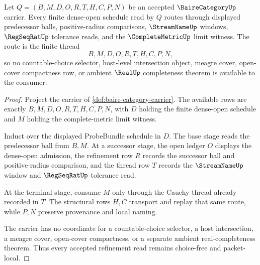 \begin{theorem}
\label{thm:bairecategory-refinement-choice-free}
Let $Q=(B,M,D,O,R,T,H,C,P,N)$ be an accepted $\BaireCategoryUp$ carrier. Every finite dense-open schedule read by $Q$ routes through displayed predecessor balls, positive-radius comparisons, $\StreamNameUp$ windows, $\RegSeqRatUp$ tolerance reads, and the $\CompleteMetricUp$ limit witness. The route is the finite thread
$$
B,M,D,O,R,T,H,C,P,N,
$$
so no countable-choice selector, host-level intersection object, meagre cover, open-cover compactness row, or ambient $\RealUp$ completeness theorem is available to the consumer.
\end{theorem}
\begin{proof}
Project the carrier of \autoref{def:baire-category-carrier}. The available rows are exactly $B,M,D,O,R,T,H,C,P,N$, with $D$ holding the finite dense-open schedule and $M$ holding the complete-metric limit witness.

Induct over the displayed ProbeBundle schedule in $D$. The base stage reads the predecessor ball from $B,M$. At a successor stage, the open ledger $O$ displays the dense-open admission, the refinement row $R$ records the successor ball and positive-radius comparison, and the thread row $T$ records the $\StreamNameUp$ window and $\RegSeqRatUp$ tolerance read.

At the terminal stage, consume $M$ only through the Cauchy thread already recorded in $T$. The structural rows $H,C$ transport and replay that same route, while $P,N$ preserve provenance and local naming.

The carrier has no coordinate for a countable-choice selector, a host intersection, a meagre cover, open-cover compactness, or a separate ambient real-completeness theorem. Thus every accepted refinement read remains choice-free and packet-local.
\end{proof}

